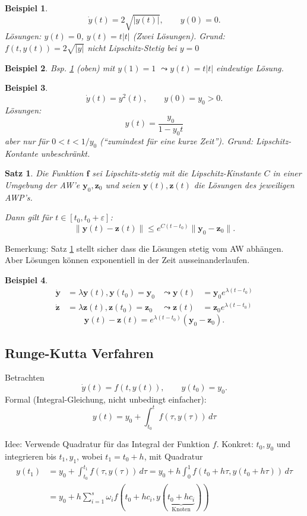 \documentclass[a4paper]{article}
\newtheorem{thm}{Satz}
\newtheorem{bsp}{Beispiel}
\renewcommand{\vec}[1]{\mathbf{\bm{#1}}}
\begin{document}
\begin{bsp} \label{bsp:dgl-eindeutig-8}
  \[
    \dot{y}(t) = 2\sqrt{|y(t)|}, \qquad y(0) = 0.
  \]
  Lösungen: $y(t) = 0$, $y(t) = t |t|$ (Zwei Lösungen).
  Grund: $f(t, y(t)) = 2\sqrt{|y|}$ nicht Lipschitz-Stetig bei $y=0$
\end{bsp}
\begin{bsp}
  Bsp. \ref{bsp:dgl-eindeutig-8} (oben) mit $y(1) = 1$ $\leadsto y(t) = t|t|$
  eindeutige Lösung.
\end{bsp}
\begin{bsp}
  \[
    \dot{y}(t) = y^2(t), \qquad
    y(0) = y_0 > 0.
  \]
  Lösungen:
  \[
    y(t) = \frac{y_0}{1-y_0 t}
  \]
  aber nur für $0 < t < 1/y_0$ (``zumindest für eine kurze Zeit'').
  Grund: Lipschitz-Kontante unbeschränkt.
\end{bsp}

\begin{thm}
  \label{thm:lipschitz-stetig-distanz}
  Die Funktion $\vec{f}$ sei Lipschitz-stetig mit die Lipschitz-Kinstante $C$
  in einer Umgebung der AW'e $\vec{y}_0, \vec{z}_0$ und seien $\vec{y}(t),
  \vec{z}(t)$ die Lösungen des jeweiligen AWP's.

  Dann gilt für $t \in [t_0, t_0 + \varepsilon]$:
  \[
    \|\vec{y}(t) - \vec{z}(t)\|
    \leq e^{C(t-t_0)} \|\vec{y}_0 - \vec{z}_0\|.
  \]
\end{thm}

Bemerkung: Satz \ref{thm:lipschitz-stetig-distanz} stellt sicher dass die
Lösungen stetig vom AW abhängen. Aber Lösungen können exponentiell in der Zeit
ausseinanderlaufen.

\begin{bsp}
  \begin{align*}
    \dot{\vec{y}} &= \lambda \vec{y}(t), \vec{y}(t_0) = \vec{y}_0 
      &\leadsto \vec{y}(t) &= \vec{y}_0 e^{\lambda (t-t_0)} \\
    \dot{\vec{z}} &= \lambda \vec{z}(t), \vec{z}(t_0) = \vec{z}_0 
      &\leadsto \vec{z}(t) &= \vec{z}_0 e^{\lambda (t-t_0)}
  \end{align*}
  \[
    \vec{y}(t) - \vec{z}(t) = e^{\lambda (t-t_0)} (\vec{y}_0 - \vec{z}_0).
  \]
\end{bsp}

\subsection{Runge-Kutta Verfahren}

Betrachten
\[
  \dot{y}(t) = f(t, y(t)), \qquad
  y(t_0) = y_0.
\]
Formal (Integral-Gleichung, nicht unbedingt einfacher):
\[
  y(t) = y_0 + \int_{t_0}^t f(\tau, y(\tau)) \, d\tau
\]

Idee: Verwende Quadratur für das Integral der Funktion $f$. Konkret: $t_0,
y_0$ und integrieren bis $t_1, y_1$, wobei $t_1 = t_0 + h$, mit Quadratur
\begin{align*}
  y(t_1) &= y_0 + \int_{t_0}^{t_1} f(\tau, y(\tau)) \, d\tau
    = y_0 + h \int_0^1 f(t_0 + h\tau, y(t_0 + h\tau)) \, d\tau \\
  &= y_0 + h \sum_{i=1}^s \omega_i
    f(t_0 + h c_i, y(\underbrace{t_0 + h c_i}_\text{Knoten}))
\end{align*}
\skelfig
\end{document}
